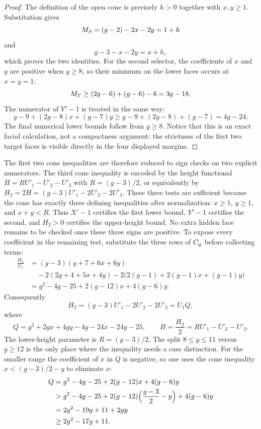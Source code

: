 \documentclass[11pt]{article}
\theoremstyle{remark}
\numberwithin{equation}{section}
\begin{document}
\begin{proof}
The definition of the open cone is precisely \(h>0\) together with
\(x,y\geq1\).  Substitution gives
\[
M_S=(g-2)-2x-2y=1+h
\]
and
\[
g-3-x-2y=x+h,
\]
which proves the two identities.  For the second selector, the coefficients of
\(x\) and \(y\) are positive when \(g\geq8\), so their minimum on the lower
faces occurs at \(x=y=1\):
\[
M_T\geq(2g-6)+(g-6)-6=3g-18.
\]
The numerator of \(Y'-1\) is treated in the same way:
\[
g-9+(2g-8)x+(g-7)y
\geq g-9+(2g-8)+(g-7)=4g-24.
\]
The final numerical lower bounds follow from \(g\geq8\).  Notice that this is
an exact facial calculation, not a compactness argument: the strictness of the
first two target faces is visible directly in the four displayed margins.
\end{proof}

The first two cone inequalities are therefore reduced to sign checks on two
explicit numerators.  The third cone inequality is encoded by the height
functional \(H=R U'_1-U'_2-U'_3\) with \(R=(g-3)/2\), or equivalently by
\(H_2=2H=(g-3)U'_1-2U'_2-2U'_3\).
These three tests are sufficient because the cone has exactly three defining
inequalities after normalization: \(x\geq 1\), \(y\geq 1\), and \(x+y<R\).
Thus \(X'-1\) certifies the first lower bound, \(Y'-1\) certifies the second,
and \(H_2>0\) certifies the upper-height bound.  No extra hidden face remains
to be checked once these three signs are positive.
To expose every coefficient in the remaining test, substitute the three rows
of \(C_g\) before collecting terms:
\begin{align*}
\frac{H_2}{U_1}
&=(g-3)(g+7+6x+6y)\\
&\quad-2(2g+4+5x+4y)
      -2\bigl(2(g-1)+2(g-1)x+(g-1)y\bigr)\\
&=g^2-4g-25+2(g-12)x+4(g-6)y.
\end{align*}
Consequently
\[
H_2=(g-3)U'_1-2U'_2-2U'_3=U_1Q,
\]
where
\[
Q=g^2+2gx+4gy-4g-24x-24y-25,
\qquad
H=\frac{H_2}{2}=R U'_1-U'_2-U'_3.
\]
The lower-height parameter is \(R=(g-3)/2\).  The split
\(8\leq g\leq 11\) versus \(g\geq 12\) is the only place where the inequality
needs a case distinction.  For the smaller range the coefficient of \(x\) in
\(Q\) is negative, so one uses the cone inequality \(x<(g-3)/2-y\) to
eliminate \(x\):
\begin{align*}
Q
&=g^2-4g-25+2(g-12)x+4(g-6)y\\
&>g^2-4g-25+2(g-12)\Bigl(\frac{g-3}{2}-y\Bigr)+4(g-6)y\\
&=2g^2-19g+11+2gy\\
&\geq 2g^2-17g+11.
\end{align*}
\end{document}
